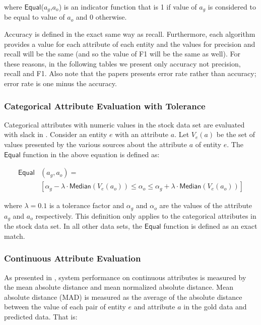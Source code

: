 \documentclass{acm_proc_article-sp}
\begin{document}
where $\mathsf{Equal}$($a_g$,$a_o$) is an indicator function that is 1 if value of $a_g$ is considered to be equal to value of $a_o$  and 0 otherwise.


Accuracy is defined in the exact same way as recall. Furthermore, each algorithm  provides a value for each attribute of each entity and the values for precision and recall will be the same (and so the value of F1 will be the same as well). For these reasons, in the following tables we present only accuracy not precision, recall and F1. Also note that the papers \cite{li:resolving} presents error rate rather than accuracy; error rate is one minus the accuracy. 

\subsubsection{Categorical Attribute Evaluation with Tolerance}

Categorical attributes with numeric values in the stock data set are evaluated with slack in \cite{li:truth}. Consider an entity $e$ with an attribute $a$. Let $V_e(a)$ be the set of values presented by the various sources about the attribute $a$ of entity $e$. The $\mathsf{Equal}$ function in the above equation is defined as:

\begin{align}
\mathsf{Equal}&(a_g,a_o) =\\ \nonumber
&[\alpha_g - \lambda \cdot  \mathsf{Median}(V_e(a_o)) \leq \alpha_o \leq \alpha_g + \lambda \cdot  \mathsf{Median}(V_e(a_o))]
\end{align}

where $\lambda = 0.1$ is a tolerance factor and $\alpha_g$ and $\alpha_o$ are the values of the attribute $a_g$ and $a_o$ respectively. This definition only applies to the categorical attributes in the stock data set. In all other data sets, the $\mathsf{Equal}$ function is defined as an exact match.

\subsubsection{Continuous Attribute Evaluation}

As presented in \cite{li:resolving}, system performance on continuous attributes is measured by the mean absolute distance and mean normalized absolute distance. Mean absolute distance (MAD) is measured as the average of the absolute distance between the value of each pair of entity $e$ and attribute $a$ in the gold data and predicted data. That is:
\end{document}
